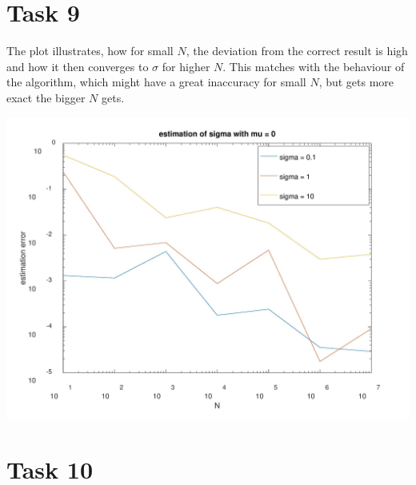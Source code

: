 \documentclass[10pt,a4paper]{article}
\begin{document}
\section*{Task 9}

The plot illustrates, how for small $N$, the deviation from the correct result is high and how it then converges to $\sigma$ for higher $N$. This matches with the behaviour of the algorithm, which might have a great inaccuracy for small $N$, but gets more exact the bigger $N$ gets.

\begin{center}
\includegraphics[scale=0.3]{sigma_err.jpeg}
\end{center}

\section*{Task 10}
\end{document}
